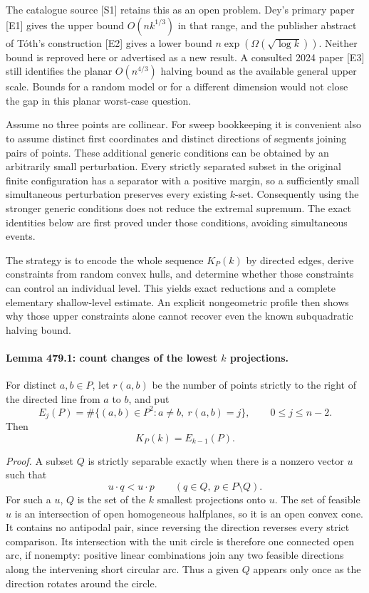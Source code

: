 \documentclass[11pt]{article}
\begin{document}
The catalogue source [S1] retains this as an open problem. Dey's primary
paper [E1] gives the upper bound $O(nk^{1/3})$ in that range, and the
publisher abstract of T\'oth's construction [E2] gives a lower bound
$n\exp(\Omega(\sqrt{\log k}))$. Neither bound is reproved here or
advertised as a new result. A consulted 2024 paper [E3] still identifies
the planar $O(n^{4/3})$ halving bound as the available general upper
scale. Bounds for a random model or for a different dimension would not
close the gap in this planar worst-case question.

Assume no three points are collinear. For sweep bookkeeping it is convenient
also to assume distinct first coordinates and distinct directions of
segments joining pairs of points. These additional generic conditions
can be obtained by an arbitrarily small perturbation. Every strictly
separated subset in the original finite configuration has a separator with
a positive margin, so a sufficiently small simultaneous perturbation
preserves every existing $k$-set. Consequently using the stronger generic
conditions does not reduce the extremal supremum. The exact identities
below are first proved under those conditions, avoiding simultaneous events.

The strategy is to encode the whole sequence $K_P(k)$ by directed edges,
derive constraints from random convex hulls, and determine whether those
constraints can control an individual level. This yields exact reductions
and a complete elementary shallow-level estimate. An explicit nongeometric
profile then shows why those upper constraints alone cannot recover even
the known subquadratic halving bound.

\paragraph{Lemma 479.1: count changes of the lowest $k$ projections.}
For distinct $a,b\in P$, let $r(a,b)$ be the number of points strictly
to the right of the directed line from $a$ to $b$, and put
\[
 E_j(P)=\#\{(a,b)\in P^2:a\ne b,\ r(a,b)=j\},
                  \qquad 0\leq j\leq n-2.
\]
Then
\begin{equation}\label{a479:edgeidentity}
                               K_P(k)=E_{k-1}(P).
\end{equation}

\emph{Proof.} A subset $Q$ is strictly separable exactly when there is
a nonzero vector $u$ such that
\[
                      u\cdot q<u\cdot p
                \qquad(q\in Q,\ p\in P\setminus Q).
\]
For such a $u$, $Q$ is the set of the $k$ smallest projections onto $u$.
The set of feasible $u$ is an intersection of open homogeneous halfplanes,
so it is an open convex cone. It contains no antipodal pair, since reversing
the direction reverses every strict comparison. Its intersection with the
unit circle is therefore one connected open arc, if nonempty: positive
linear combinations join any two feasible directions along the intervening
short circular arc. Thus a given $Q$ appears only once as the direction
rotates around the circle.
\end{document}

